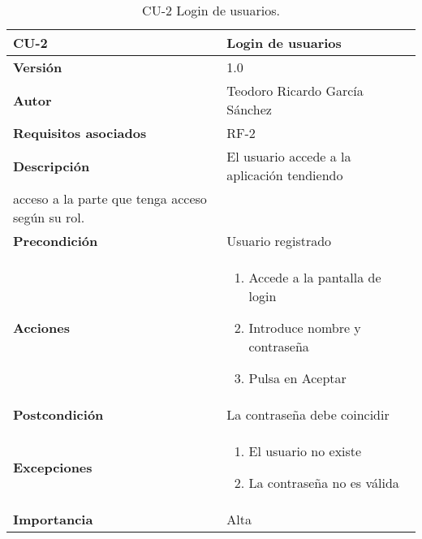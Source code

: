 \begin{table}[p]
	\centering
	\begin{tabularx}{\linewidth}{ p{} p{} }
		\toprule
		\textbf{CU-2}    & \textbf{Login de usuarios}\\
		\toprule
		\textbf{Versión}              & 1.0    \\
		\textbf{Autor}                & Teodoro Ricardo García Sánchez \\
		\textbf{Requisitos asociados} & RF-2 \\
		\textbf{Descripción}          & El usuario accede a la aplicación tendiendo \\
										acceso a la parte que tenga acceso según su rol. \\
		\textbf{Precondición}         & Usuario registrado \\
		\textbf{Acciones}             &
		\begin{enumerate}
			\def\labelenumi{\arabic{enumi}.}
			\tightlist
			\item Accede a la pantalla de login 
			\item Introduce nombre y contraseña
			\item Pulsa en Aceptar
		\end{enumerate}\\
		\textbf{Postcondición}        & La contraseña debe coincidir \\
		\textbf{Excepciones}          & 
		\begin{enumerate}
			\def\labelenumi{\arabic{enumi}.}
			\tightlist
			\item El usuario no existe 
			\item La contraseña no es válida 
		\end{enumerate}\\
		\textbf{Importancia}          & Alta\\
		\bottomrule
	\end{tabularx}
	\caption{CU-2 Login de usuarios.}
\end{table}
